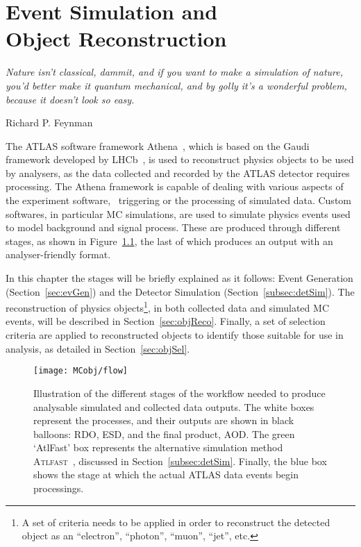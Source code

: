 \chapter[Event Simulation and Object Reconstruction]{Event Simulation and \protect\\Object Reconstruction}
\label{ch:evSimObjReco}
\epigraph{\emph{Nature isn't classical, dammit, and if you want to make a simulation of nature, you'd better make it quantum mechanical, and by golly it's a wonderful problem, because it doesn't look so easy.}} {Richard P. Feynman}

	The \ac{ATLAS} software framework Athena~\cite{TDR2005}, which is based on the Gaudi~\cite{Gaudi2000} framework developed by \ac{LHCb}~\cite{LHCb2008}, is used to reconstruct physics objects to be used by analysers, as the data collected and recorded by the \ac{ATLAS} detector requires processing. The Athena framework is capable of dealing with various aspects of the experiment software, \eg\ triggering or the processing of simulated data. Custom softwares, in particular \ac{MC} simulations, are used to simulate physics events used to model background and signal process. These are produced through different stages, as shown in Figure~\ref{fig:workflow}, the last of which produces an output with an analyser-friendly format. 

	In this chapter the stages will be briefly explained as it follows: Event Generation (Section~\ref{sec:evGen}) and the Detector Simulation (Section~\ref{subsec:detSim}). The reconstruction of physics objects\footnote{A set of criteria needs to be applied in order to reconstruct the detected object as an ``electron'', ``photon'', ``muon'', ``jet'', etc.}, in both collected data and simulated \ac{MC} events, will be described in Section~\ref{sec:objReco}. Finally, a set of selection criteria are applied to reconstructed objects to identify those suitable for use in analysis, as detailed in Section~\ref{sec:objSel}.

	\begin{figure}
		\centering
		\texttt{[image: MCobj/flow]}
		\caption{\label{fig:workflow} Illustration of the different stages of the workflow needed to produce analysable simulated and collected data outputs. The white boxes represent the processes, and their outputs are shown in black balloons: \ac{RDO}, \ac{ESD}, and the final product, \ac{AOD}. The green `AtlFast' box represents the alternative simulation method \textsc{Atlfast}~\cite{Lukas2012}, discussed in Section~\ref{subsec:detSim}. Finally, the blue box shows the stage at which the actual \ac{ATLAS} data events begin processings.}
	\end{figure}



